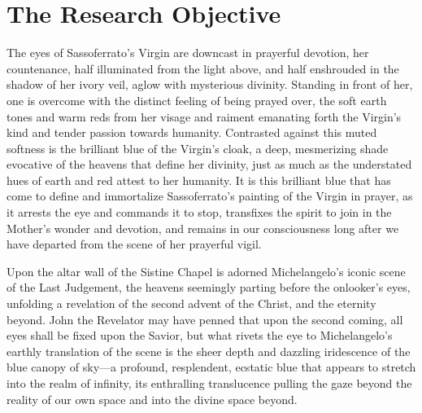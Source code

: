     
    
    

    \hypertarget{The Research Objective}{\chapter{The Research Objective}\label{The Research Objective}}
    The eyes of Sassoferrato's Virgin are downcast in prayerful devotion,
her countenance, half illuminated from the light above, and half
enshrouded in the shadow of her ivory veil, aglow with mysterious
divinity. Standing in front of her, one is overcome with the distinct
feeling of being prayed over, the soft earth tones and warm reds from
her visage and raiment emanating forth the Virgin's kind and tender
passion towards humanity. Contrasted against this muted softness is the
brilliant blue of the Virgin's cloak, a deep, mesmerizing shade
evocative of the heavens that define her divinity, just as much as the
understated hues of earth and red attest to her humanity. It is this
brilliant blue that has come to define and immortalize Sassoferrato's
painting of the Virgin in prayer, as it arrests the eye and commands it
to stop, transfixes the spirit to join in the Mother's wonder and
devotion, and remains in our consciousness long after we have departed
from the scene of her prayerful vigil.

Upon the altar wall of the Sistine Chapel is adorned Michelangelo's
iconic scene of the Last Judgement, the heavens seemingly parting before
the onlooker's eyes, unfolding a revelation of the second advent of the
Christ, and the eternity beyond. John the Revelator may have penned that
upon the second coming, all eyes shall be fixed upon the Savior, but
what rivets the eye to Michelangelo's earthly translation of the scene
is the sheer depth and dazzling iridescence of the blue canopy of
sky---a profound, resplendent, ecstatic blue that appears to stretch
into the realm of infinity, its enthralling translucence pulling the
gaze beyond the reality of our own space and into the divine space
beyond.

